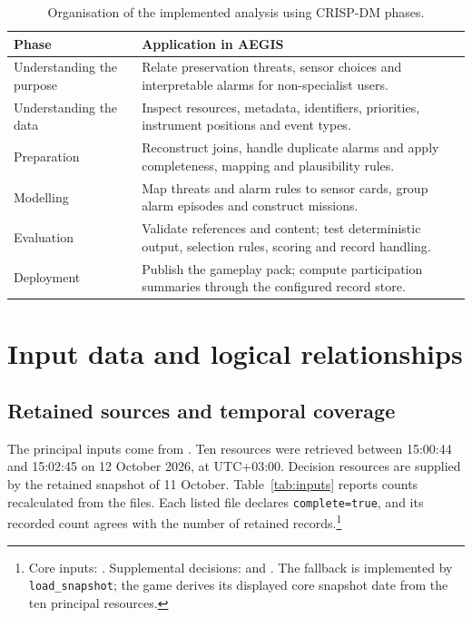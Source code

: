\documentclass[10pt,a4paper]{article}
\begin{document}
\begin{table}[htbp]
\centering\small
\caption{Organisation of the implemented analysis using CRISP-DM phases.}\label{tab:crisp}
\begin{tabularx}{\linewidth}{@{}>{\raggedright\arraybackslash}p{3.0cm}Y@{}}
\toprule Phase & Application in AEGIS\\\midrule
Understanding the purpose & Relate preservation threats, sensor choices and interpretable alarms for non-specialist users.\\
Understanding the data & Inspect resources, metadata, identifiers, priorities, instrument positions and event types.\\
Preparation & Reconstruct joins, handle duplicate alarms and apply completeness, mapping and plausibility rules.\\
Modelling & Map threats and alarm rules to sensor cards, group alarm episodes and construct missions.\\
Evaluation & Validate references and content; test deterministic output, selection rules, scoring and record handling.\\
Deployment & Publish the gameplay pack; compute participation summaries through the configured record store.\\
\bottomrule
\end{tabularx}
\end{table}

\section{Input data and logical relationships}
\subsection{Retained sources and temporal coverage}
The principal inputs come from . Ten resources were retrieved between 15:00:44 and 15:02:45 on 12 October 2026, at UTC+03:00. Decision resources are supplied by the retained snapshot of 11 October. Table~\ref{tab:inputs} reports counts recalculated from the files. Each listed file declares \texttt{complete=true}, and its recorded count agrees with the number of retained records.\footnote{Core inputs: . Supplemental decisions:  and . The fallback is implemented by \texttt{load\_snapshot}; the game derives its displayed core snapshot date from the ten principal resources.}
\end{document}
